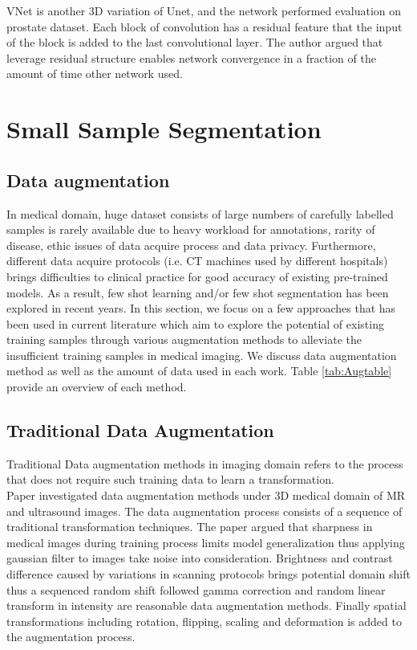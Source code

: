 VNet \cite{milletari_v-net_2016} is another 3D variation of Unet, and the network performed evaluation on prostate dataset. Each block of convolution has a residual feature that the input of the block is added to the last convolutional layer. The author argued that leverage residual structure enables network convergence in a fraction of the amount of time other network used.


\section{Small Sample Segmentation}

\subsection{Data augmentation}
In medical domain, huge dataset consists of large numbers of carefully labelled samples is rarely available due to heavy workload for annotations, rarity of disease, ethic issues of data acquire process and data privacy. Furthermore, different data acquire protocols (i.e. CT machines used by different hospitals) brings difficulties to clinical practice for good accuracy of existing pre-trained models. As a result, few shot learning and/or few shot segmentation has been explored in recent years. 
In this section, we focus on a few approaches that has been used in current literature which aim to explore the potential of existing training samples through various augmentation methods to alleviate the insufficient training samples in medical imaging. We discuss data augmentation method as well as the amount of data used in each work. Table \ref{tab:Augtable} provide an overview of each method.

\subsection{Traditional Data Augmentation}
Traditional Data augmentation methods in imaging domain refers to the process that does not require such training data to learn a transformation.\\

Paper \cite{zhang_when_2019} investigated data augmentation methods under 3D medical domain of MR and ultrasound images. 
The data augmentation process consists of a sequence of traditional transformation techniques. The paper argued that sharpness in medical images during training process limits model generalization thus applying gaussian filter to images take noise into consideration. Brightness and contrast difference caused by variations in scanning protocols brings potential domain shift thus a sequenced random shift followed gamma correction and random linear transform in intensity are reasonable data augmentation methods. Finally spatial transformations including rotation, flipping, scaling and deformation is added to the augmentation process.

